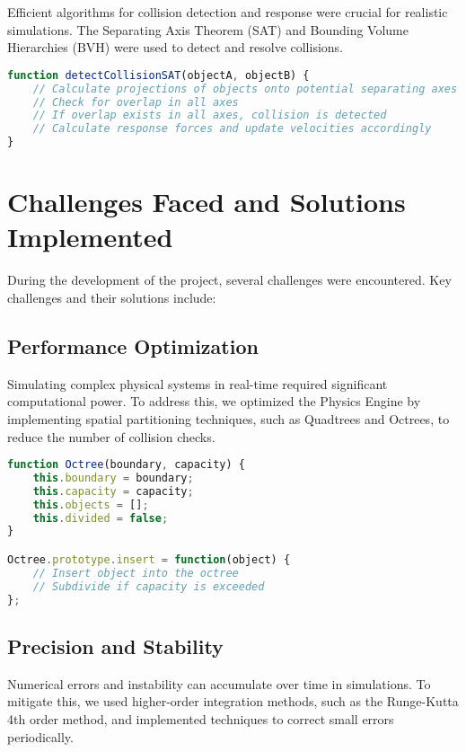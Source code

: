 Efficient algorithms for collision detection and response were crucial for realistic simulations. The Separating Axis Theorem (SAT) and Bounding Volume Hierarchies (BVH) were used to detect and resolve collisions.

\begin{lstlisting}[language=JavaScript, caption=Collision Detection Using SAT]
function detectCollisionSAT(objectA, objectB) {
    // Calculate projections of objects onto potential separating axes
    // Check for overlap in all axes
    // If overlap exists in all axes, collision is detected
    // Calculate response forces and update velocities accordingly
}
\end{lstlisting}

\section{Challenges Faced and Solutions Implemented}

During the development of the project, several challenges were encountered. Key challenges and their solutions include:

\subsection{Performance Optimization}

Simulating complex physical systems in real-time required significant computational power. To address this, we optimized the Physics Engine by implementing spatial partitioning techniques, such as Quadtrees and Octrees, to reduce the number of collision checks.

\begin{lstlisting}[language=JavaScript, caption=Spatial Partitioning with Octree]
function Octree(boundary, capacity) {
    this.boundary = boundary;
    this.capacity = capacity;
    this.objects = [];
    this.divided = false;
}

Octree.prototype.insert = function(object) {
    // Insert object into the octree
    // Subdivide if capacity is exceeded
};
\end{lstlisting}

\subsection{Precision and Stability}

Numerical errors and instability can accumulate over time in simulations. To mitigate this, we used higher-order integration methods, such as the Runge-Kutta 4th order method, and implemented techniques to correct small errors periodically.

